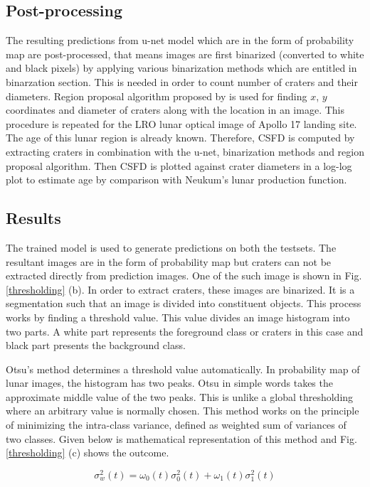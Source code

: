 \documentclass[11pt]{article}
\begin{document}
\subsection{Post-processing}
The resulting predictions from u-net model which are in the form of probability map are post-processed, that means images are first binarized (converted to white and black pixels) by applying various binarization methods which are entitled in binarzation section. This is needed in order to count number of craters and their diameters. Region proposal algorithm proposed by \cite{burger2009principles} is used for finding $x$, $y$ coordinates and diameter of craters along with the location in an image. This procedure is repeated for the LRO lunar optical image of Apollo 17 landing site. The age of this lunar region is already known. Therefore, CSFD is computed by extracting craters in combination with the u-net, binarization methods and region proposal algorithm. Then CSFD is plotted against crater diameters in a log-log plot to estimate age by comparison with Neukum's lunar production function.

\subsection{Results}
The trained model is used to generate predictions on both the testsets. The resultant images are in the form of probability map but craters can not be extracted directly from prediction images. One of the such image is shown in Fig. \ref{thresholding} (b). In order to extract craters, these images are binarized. It is a segmentation such that an image is divided into constituent objects. This process works by finding a threshold value. This value divides an image histogram into two parts. A white part represents the foreground class or craters in this case and black part presents the background class.

Otsu's method determines a threshold value automatically. In probability map of lunar images, the histogram has two peaks. Otsu in simple words takes the approximate middle value of the two peaks. This is unlike a global thresholding where an arbitrary value is normally chosen. This method works on the principle of minimizing the intra-class variance, defined as weighted sum of variances of two classes. Given below is mathematical representation of this method and Fig. \ref{thresholding} (c) shows the outcome.

\begin{equation}
\sigma_{w}^{2}(t)=\omega_{0}(t) \sigma_{0}^{2}(t)+\omega_{1}(t) \sigma_{1}^{2}(t)
\end{equation}
\end{document}
